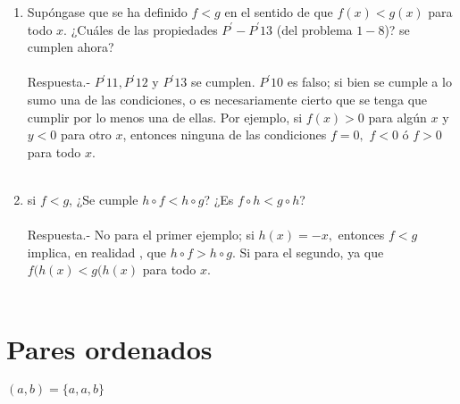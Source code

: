 \begin{enumerate}
\begin{enumerate}[\bfseries (a)]
	    \item Supóngase que se ha definido $f<g$ en el sentido de que $f(x)<g(x)$ para todo $x$. ¿Cuáles de las propiedades $P^{'}-P^{'}13$ (del problema $1-8$)? se cumplen ahora?\\\\
		Respuesta.-\; $P^{'} 11, P^{'} 12$ y $P^{'}13$ se cumplen. $P^{'}10$ es falso; si bien se cumple a lo sumo una de las condiciones, o es necesariamente cierto que se tenga que cumplir por lo menos una de ellas. Por ejemplo, si $f(x)>0$ para algún $x$ y $y<0$ para otro $x$, entonces ninguna de las condiciones $f=0,$ $f<0$ ó $f>0$ para todo $x$.\\\\

	    \item si $f<g$, ¿Se cumple $h\circ f < h \circ g$? ¿Es $f\circ h<g\circ h$?\\\\
		Respuesta.-\; No para el primer ejemplo; si $h(x)=-x,$ entonces $f<g$ implica, en realidad , que $h\circ f > h \circ g$. Si para el segundo, ya que $f(h(x)<g(h(x)$ para todo $x$.\\\\

	\end{enumerate}

    \end{enumerate}

\section{Pares ordenados}
    
    \begin{tcolorbox}[colframe = white]
	\begin{def.}
	    $(a,b) = \lbrace {a},{a,b} \rbrace$\\
	\end{def.}
    \end{tcolorbox}

